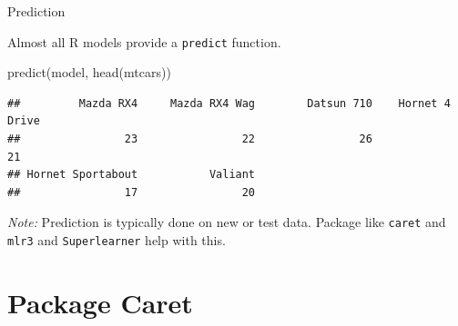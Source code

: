 \documentclass[9pt,ignorenonframetext,]{beamer}
\newenvironment{Shaded}{\begin{snugshade}}{\end{snugshade}}
\newcommand{\KeywordTok}[1]{\textcolor[rgb]{0.94,0.87,0.69}{#1}}
\newcommand{\NormalTok}[1]{\textcolor[rgb]{0.80,0.80,0.80}{#1}}
\begin{document}
\begin{frame}[fragile]{Prediction}
\protect\hypertarget{prediction}{}

Almost all R models provide a \texttt{predict} function. \vfill

\begin{Shaded}
\begin{Highlighting}[]
\KeywordTok{predict}\NormalTok{(model, }\KeywordTok{head}\NormalTok{(mtcars))}
\end{Highlighting}
\end{Shaded}

\begin{verbatim}
##         Mazda RX4     Mazda RX4 Wag        Datsun 710    Hornet 4 Drive 
##                23                22                26                21 
## Hornet Sportabout           Valiant 
##                17                20
\end{verbatim}

\vfill

\emph{Note:} Prediction is typically done on new or test data. Package
like \texttt{caret} and \texttt{mlr3} and \texttt{Superlearner} help
with this.

\end{frame}

\hypertarget{package-caret}{%
\section{Package Caret}\label{package-caret}}
\end{document}
